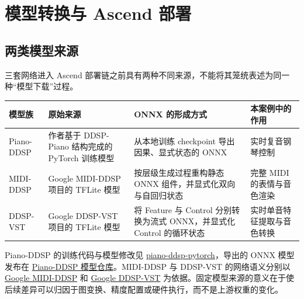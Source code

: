 \section{模型转换与 Ascend
部署}\label{src-experiment-case3-model-deployment}

\subsection{两类模型来源}\label{src-experiment-case3-model-download}

三套网络进入 Ascend
部署链之前具有两种不同来源，不能将其笼统表述为同一种``模型下载''过程。

\begin{longtable}[]{@{}
  >{\raggedright\arraybackslash}p{}
  >{\raggedright\arraybackslash}p{}
  >{\raggedright\arraybackslash}p{}
  >{\raggedright\arraybackslash}p{}@{}}
\toprule\noalign{}
\begin{minipage}[b]{\linewidth}\raggedright
模型族
\end{minipage} & \begin{minipage}[b]{\linewidth}\raggedright
原始来源
\end{minipage} & \begin{minipage}[b]{\linewidth}\raggedright
ONNX 的形成方式
\end{minipage} & \begin{minipage}[b]{\linewidth}\raggedright
本案例中的作用
\end{minipage} \\
\midrule\noalign{}
\endhead
\bottomrule\noalign{}
\endlastfoot
Piano-DDSP & 作者基于 DDSP-Piano 结构完成的 PyTorch 训练模型 &
从本地训练 checkpoint 导出因果、显式状态的 ONNX & 实时复音钢琴控制 \\
MIDI-DDSP & Google MIDI-DDSP 项目的 TFLite 模型 & 按层级生成过程重构静态
ONNX 组件，并显式化双向与自回归状态 & 完整 MIDI 的表情与音色渲染 \\
DDSP-VST & Google DDSP-VST 项目的 TFLite 模型 & 将 Feature 与 Control
分别转换为流式 ONNX，并显式化 Control 的循环状态 &
实时单音特征提取与音色转换 \\
\end{longtable}

Piano-DDSP 的训练代码与模型修改见
\href{https://github.com/zhouxzh/piano-ddsp-pytorch/tree/main}{piano-ddsp-pytorch}，导出的
ONNX 模型发布在
\href{https://huggingface.co/zhouxzh/piano-ddsp-ascend310}{Piano-DDSP
模型仓库}。MIDI-DDSP 与 DDSP-VST 的网络语义分别以
\href{https://github.com/magenta/midi-ddsp}{Google MIDI-DDSP} 和
\href{https://github.com/magenta/ddsp-vst}{Google DDSP-VST}
为依据。固定模型来源的意义在于使后续差异可以归因于图变换、精度配置或硬件执行，而不是上游权重的变化。

